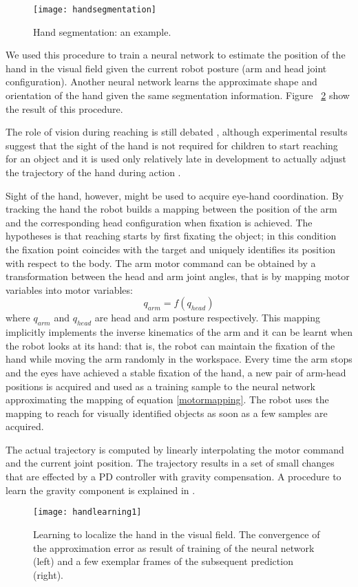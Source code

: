 \begin{figure}
\centering
\texttt{[image: handsegmentation]}
\caption{Hand segmentation: an example.}
\label{fig-handsegmentation}
\end{figure}

We used this procedure to train a neural network to estimate the position of the hand in the visual field given the current robot posture (arm and head joint configuration). Another neural network learns the approximate shape and orientation of the hand given the same segmentation information. Figure ~\ref{sec-handlearning1} show the result of this procedure. 

The role of vision during reaching is still debated \cite{saunders03humans}, although experimental results suggest that the sight of the hand is not required for children to start reaching for an object \cite{clifton93isvisually,clifton94multimodal} and it is used only relatively late in development to actually adjust the trajectory of the hand during action \cite{ashmead93visual}. 

Sight of the hand, however, might be used to acquire eye-hand coordination. By tracking the hand the robot builds a mapping between the position of the arm and the corresponding head configuration when fixation is achieved. The hypotheses is that reaching starts by first fixating the object; in this condition the fixation point coincides with the target and uniquely identifies its position with respect to the body. The arm motor command can be obtained by a transformation between the head and arm joint angles, that is by mapping motor variables into motor variables:
\begin{equation}q_{arm}=f(q_{head})\label{motormapping}\end{equation}
\noindent where $q_{arm}$ and $q_{head}$ are head and arm posture respectively. This mapping implicitly implements the inverse kinematics of the arm and it can be learnt when the robot looks at its hand: that is, the robot can maintain the fixation of the hand while moving the arm randomly in the workspace. Every time the arm stops and the eyes have achieved a stable fixation of the hand, a new pair of arm-head positions is acquired and used as a training sample to the neural network approximating the mapping of equation \ref{motormapping}. The robot uses the mapping to reach for visually identified objects as soon as a few samples are acquired.

The actual trajectory is computed by linearly interpolating the motor command and the current joint position. The trajectory results in a set of small changes that are effected by a PD controller with gravity compensation. A procedure to learn the gravity component is explained in \cite{natale04thesis}.

\begin{figure}
\centering
\texttt{[image: handlearning1]}
\caption{Learning to localize the hand in the visual field. The convergence of the approximation error as result of training of the neural network (left) and a few exemplar frames of the subsequent prediction (right).}
\label{sec-handlearning1}
\end{figure}

